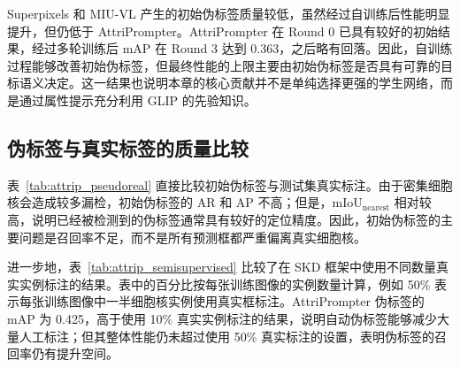 Superpixels 和 MIU-VL 产生的初始伪标签质量较低，虽然经过自训练后性能明显提升，但仍低于 AttriPrompter。AttriPrompter 在 Round 0 已具有较好的初始结果，经过多轮训练后 mAP 在 Round 3 达到 0.363，之后略有回落。因此，自训练过程能够改善初始伪标签，但最终性能的上限主要由初始伪标签是否具有可靠的目标语义决定。这一结果也说明本章的核心贡献并不是单纯选择更强的学生网络，而是通过属性提示充分利用 GLIP 的先验知识。

\subsection{伪标签与真实标签的质量比较}

表~\ref{tab:attrip_pseudoreal} 直接比较初始伪标签与测试集真实标注。由于密集细胞核会造成较多漏检，初始伪标签的 AR 和 AP 不高；但是，$\mathrm{mIoU}_{\mathrm{nearest}}$ 相对较高，说明已经被检测到的伪标签通常具有较好的定位精度。因此，初始伪标签的主要问题是召回率不足，而不是所有预测框都严重偏离真实细胞核。

\begin{table}[t]
\caption{初始伪标签与真实标注的直接比较。}
\label{tab:attrip_pseudoreal}
\begin{center}
\end{center}
\vskip -0.1in
\end{table}

进一步地，表~\ref{tab:attrip_semisupervised} 比较了在 SKD 框架中使用不同数量真实实例标注的结果。表中的百分比按每张训练图像的实例数量计算，例如 50\% 表示每张训练图像中一半细胞核实例使用真实框标注。AttriPrompter 伪标签的 mAP 为 0.425，高于使用 10\% 真实实例标注的结果，说明自动伪标签能够减少大量人工标注；但其整体性能仍未超过使用 50\% 真实标注的设置，表明伪标签的召回率仍有提升空间。

